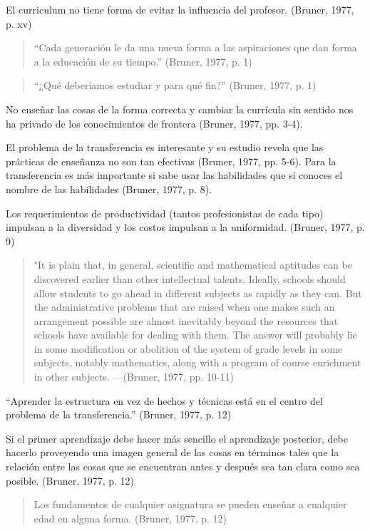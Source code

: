 \documentclass[
  12,
]{scrartcl}
\begin{document}
El curriculum no tiene forma de evitar la influencia del profesor.
(Bruner, 1977, p. xv)

\begin{quote}
``Cada generación le da una nueva forma a las aspiraciones que dan forma
a la educación de su tiempo.'' (Bruner, 1977, p. 1)
\end{quote}

\begin{quote}
``¿Qué deberíamos estudiar y para qué fin?'' (Bruner, 1977, p. 1)
\end{quote}

No enseñar las cosas de la forma correcta y cambiar la currícula sin
sentido nos ha privado de los conocimientos de frontera (Bruner, 1977,
pp. 3-4).

El problema de la transferencia es interesante y su estudio revela que
las prácticas de enseñanza no son tan efectivas (Bruner, 1977, pp. 5-6).
Para la transferencia es más importante si sabe usar las habilidades que
si conoces el nombre de las habilidades (Bruner, 1977, p. 8).

Los requerimientos de productividad (tantos profesionistas de cada tipo)
impulsan a la diversidad y los costos impulsan a la uniformidad.
(Bruner, 1977, p. 9)

\begin{quote}
"It is plain that, in general, scientific and mathematical aptitudes can
be discovered earlier than other intellectual talents. Ideally, schools
should allow students to go ahead in different subjects as rapidly as
they can. But the administrative problems that are raised when one makes
such an arrangement possible are almost inevitably beyond the resources
that schools have available for dealing with them. The answer will
probably lie in some modification or abolition of the system of grade
levels in some subjects, notably mathematics, along with a program of
course enrichment in other subjects. ---(Bruner, 1977, pp. 10-11)
\end{quote}

``Aprender la estructura en vez de hechos y técnicas está en el centro
del problema de la transferencia.'' (Bruner, 1977, p. 12)

Si el primer aprendizaje debe hacer más sencillo el aprendizaje
posterior, debe hacerlo proveyendo una imagen general de las cosas en
términos tales que la relación entre las cosas que se encuentran antes y
después sea tan clara como sea posible. (Bruner, 1977, p. 12)

\begin{quote}
Los fundamentos de cualquier asignatura se pueden enseñar a cualquier
edad en alguna forma. (Bruner, 1977, p. 12)
\end{quote}
\end{document}
